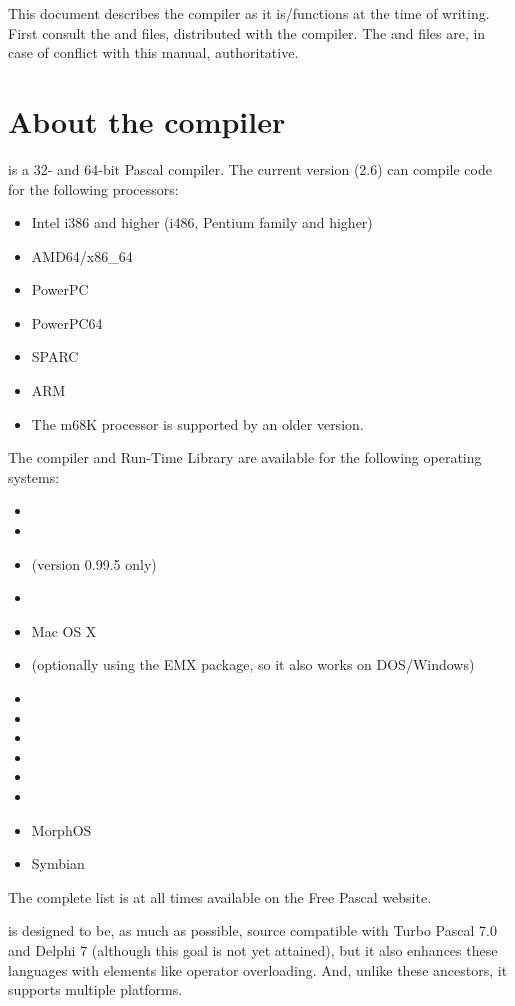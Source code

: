 This document describes the compiler as it is/functions at the time of
writing. First consult the  and  files, distributed 
with the compiler. The  and  files are, in case of 
conflict with this manual, authoritative.

\section{About the compiler}
\fpc is a 32- and 64-bit Pascal compiler. The current version (2.6)
can compile code for the following processors:
\begin{itemize}
\item Intel i386 and higher (i486, Pentium family and higher)
\item AMD64/x86\_64
\item PowerPC
\item PowerPC64
\item SPARC
\item ARM
\item The m68K processor is supported by an older version.
\end{itemize}
The compiler and Run-Time Library are available for the following operating systems:
\begin{itemize}
\item \dos
\item \linux %
\item \amiga (version 0.99.5 only)
\item \windows
\item Mac OS X 
\item \ostwo (optionally using the EMX package, so it also works on DOS/Windows)
\item \freebsd
\item \beos 
\item \solaris
\item \netbsd 
\item \netware
\item \openbsd 
\item MorphOS
\item Symbian
\end{itemize}
The complete list is at all times available on the Free Pascal website.

\fpc is designed to be, as much as possible, source compatible with
Turbo Pascal 7.0 and Delphi 7 (although this goal is not yet attained),
but it also enhances these languages with elements like operator overloading.
And, unlike these ancestors, it supports multiple platforms.

